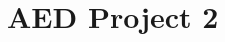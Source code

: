 \chapter{AED Project 2}
\hypertarget{md__r_e_a_d_m_e}{}\label{md__r_e_a_d_m_e}
\label{md__r_e_a_d_m_e_autotoc_md0}%
%
